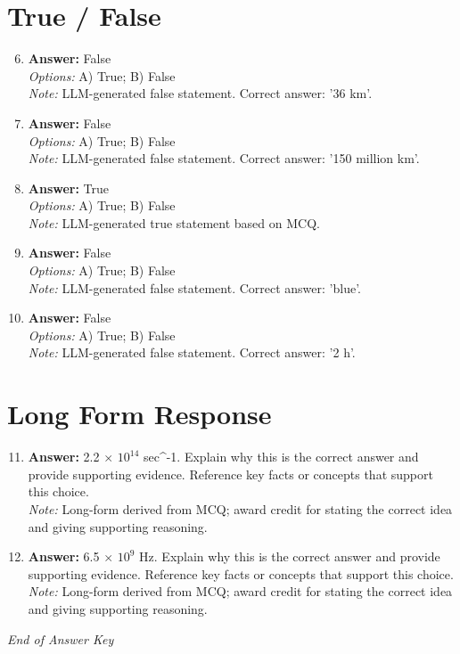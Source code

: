 \documentclass[12pt]{article}
\begin{document}
\section*{True / False}
\begin{enumerate}[label=\arabic*.]
\setcounter{enumi}{5}
\item \textbf{Answer:} False
\\ \textit{Options:} A) True; B) False
\\ \textit{Note:} LLM-generated false statement. Correct answer: '36 km'.
\item \textbf{Answer:} False
\\ \textit{Options:} A) True; B) False
\\ \textit{Note:} LLM-generated false statement. Correct answer: '150 million km'.
\item \textbf{Answer:} True
\\ \textit{Options:} A) True; B) False
\\ \textit{Note:} LLM-generated true statement based on MCQ.
\item \textbf{Answer:} False
\\ \textit{Options:} A) True; B) False
\\ \textit{Note:} LLM-generated false statement. Correct answer: 'blue'.
\item \textbf{Answer:} False
\\ \textit{Options:} A) True; B) False
\\ \textit{Note:} LLM-generated false statement. Correct answer: '2 h'.
\end{enumerate}

\section*{Long Form Response}
\begin{enumerate}[label=\arabic*.]
\setcounter{enumi}{10}
\item \textbf{Answer:} 2.2 \ensuremath{\times} $10^14$ sec^-1. Explain why this is the correct answer and provide supporting evidence. Reference key facts or concepts that support this choice.
\\ \textit{Note:} Long-form derived from MCQ; award credit for stating the correct idea and giving supporting reasoning.
\item \textbf{Answer:} 6.5 \ensuremath{\times} $10^9$ Hz. Explain why this is the correct answer and provide supporting evidence. Reference key facts or concepts that support this choice.
\\ \textit{Note:} Long-form derived from MCQ; award credit for stating the correct idea and giving supporting reasoning.
\end{enumerate}

\vfill
\noindent\textit{End of Answer Key}
\end{document}
